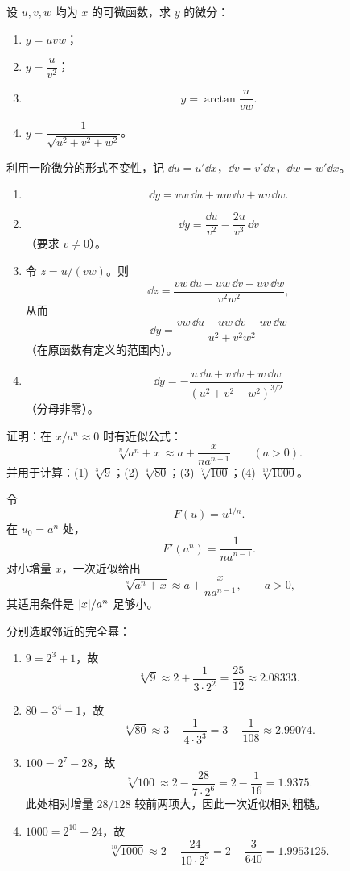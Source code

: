 \begin{xexercise}[2]
设 $u,v,w$ 均为 $x$ 的可微函数，求 $y$ 的微分：
  \begin{enumerate}[label=(\arabic*)]
    \item $y=uvw$；
    \item $y=\dfrac{u}{v^2}$；
    \item
    \[
      y=\arctan\frac{u}{vw}.
    \]
    \item $y=\dfrac1{\sqrt{u^2+v^2+w^2}}$。
  \end{enumerate}
\end{xexercise}
\begin{xsolution}
利用一阶微分的形式不变性，记 $\dd u=u'\dd x$，$\dd v=v'\dd x$，$\dd w=w'\dd x$。
\begin{enumerate}[label=(\arabic*)]
  \item
  \[
    \boxed{\dd y=vw\,\dd u+uw\,\dd v+uv\,\dd w}.
  \]
  \item
  \[
    \boxed{\dd y=\frac{\dd u}{v^2}-\frac{2u}{v^3}\,\dd v}
  \]
  （要求 $v\ne0$）。
  \item 令 $z=u/(vw)$。则
  \[
    \dd z=\frac{vw\,\dd u-uw\,\dd v-uv\,\dd w}{v^2w^2},
  \]
  从而
  \[
    \boxed{\dd y=
    \frac{vw\,\dd u-uw\,\dd v-uv\,\dd w}{u^2+v^2w^2}}
  \]
  （在原函数有定义的范围内）。
  \item
  \[
    \boxed{\dd y=-\frac{u\,\dd u+v\,\dd v+w\,\dd w}{(u^2+v^2+w^2)^{3/2}}}
  \]
  （分母非零）。
\end{enumerate}
\end{xsolution}


\begin{xexercise}[3]
证明：在 $x/a^n\approx0$ 时有近似公式：
  \[
    \sqrt[n]{a^n+x}\approx a+\frac{x}{na^{n-1}}\qquad(a>0).
  \]
  并用于计算：(1) $\sqrt[3]{9}$；(2) $\sqrt[4]{80}$；(3) $\sqrt[7]{100}$；(4) $\sqrt[10]{1000}$。
\end{xexercise}
\begin{xsolution}
令
\[
  F(u)=u^{1/n}.
\]
在 $u_0=a^n$ 处，
\[
  F'(a^n)=\frac1{na^{n-1}}.
\]
对小增量 $x$，一次近似给出
\[
  \boxed{\sqrt[n]{a^n+x}\approx a+\frac{x}{na^{n-1}}},\qquad a>0,
\]
其适用条件是 $\lvert x\rvert/a^n$ 足够小。

分别选取邻近的完全幂：
\begin{enumerate}[label=(\arabic*)]
  \item $9=2^3+1$，故
  \[
    \sqrt[3]{9}\approx2+\frac1{3\cdot2^2}=\frac{25}{12}\approx2.08333.
  \]
  \item $80=3^4-1$，故
  \[
    \sqrt[4]{80}\approx3-\frac1{4\cdot3^3}=3-\frac1{108}\approx2.99074.
  \]
  \item $100=2^7-28$，故
  \[
    \sqrt[7]{100}\approx2-\frac{28}{7\cdot2^6}=2-\frac1{16}=1.9375.
  \]
  此处相对增量 $28/128$ 较前两项大，因此一次近似相对粗糙。
  \item $1000=2^{10}-24$，故
  \[
    \sqrt[10]{1000}\approx2-\frac{24}{10\cdot2^9}=2-\frac3{640}=1.9953125.
  \]
\end{enumerate}
\end{xsolution}


